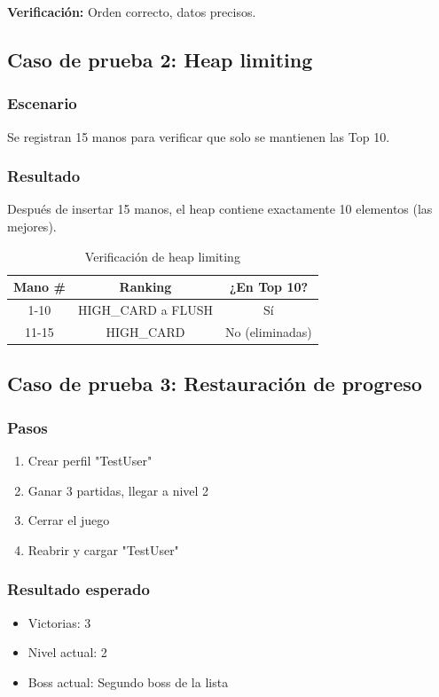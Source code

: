 \documentclass[12pt,a4paper]{article}
\begin{document}
\textbf{Verificación:} Orden correcto, datos precisos.

\subsection{Caso de prueba 2: Heap limiting}

\subsubsection{Escenario}
Se registran 15 manos para verificar que solo se mantienen las Top 10.

\subsubsection{Resultado}
Después de insertar 15 manos, el heap contiene exactamente 10 elementos (las mejores).

\begin{table}[H]
\centering
\begin{tabular}{|c|c|c|}
\hline
\textbf{Mano \#} & \textbf{Ranking} & \textbf{¿En Top 10?} \\
\hline
1-10 & HIGH\_CARD a FLUSH & Sí \\
11-15 & HIGH\_CARD & No (eliminadas) \\
\hline
\end{tabular}
\caption{Verificación de heap limiting}
\end{table}

\subsection{Caso de prueba 3: Restauración de progreso}

\subsubsection{Pasos}
\begin{enumerate}
    \item Crear perfil "TestUser"
    \item Ganar 3 partidas, llegar a nivel 2
    \item Cerrar el juego
    \item Reabrir y cargar "TestUser"
\end{enumerate}

\subsubsection{Resultado esperado}
\begin{itemize}
    \item Victorias: 3
    \item Nivel actual: 2
    \item Boss actual: Segundo boss de la lista
\end{itemize}
\end{document}
